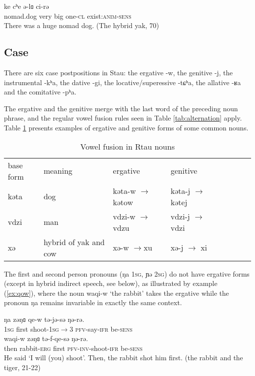 \documentclass[oneside,a4paper,11pt]{article}
\newcommand{\ipa}[1]{{\phon #1}} %
\begin{document}
\begin{exe}
\ex \label{ex:mbrogkhyi}
\gll \ipa{mbroˠcʰə} \ipa{ke} \ipa{cʰe} \ipa{ə-lɞ} \ipa{ci-rə} \\
nomad.dog very big one-\textsc{cl} exist:\textsc{anim}-\textsc{sens}\\
\glt There was a huge nomad dog. (The hybrid yak, 70)
\end{exe}



\subsection{Case} 
There are six case postpositions in Stau: the ergative \ipa{-w}, the genitive \ipa{-j}, the instrumental \ipa{-kʰa}, the dative \ipa{-gi}, the locative/superessive \ipa{-tɕʰa}, the allative \ipa{-ʁa} and the comitative \ipa{-pʰa}.


The ergative and the genitive merge with the last word of the preceding noun phrase, and the regular vowel fusion rules seen in Table \ref{tab:alternation} apply. Table \ref{tab:alternation.noun} presents examples of ergative and genitive forms of some common nouns.

\begin{table}[H]
\caption{Vowel fusion in Rtau nouns} \label{tab:alternation.noun} \centering
\begin{tabular}{l|lllllll}
\toprule
base form & meaning & ergative & genitive \\
\cline{1-4}
\ipa{kəta} & dog & \ipa{kəta-w} $\rightarrow$ \ipa{kətow} & \ipa{kəta-j} $\rightarrow$ \ipa{kətej} & \\
\ipa{vdzi} & man & \ipa{vdzi-w} $\rightarrow$  \ipa{vdzu} & \ipa{vdzi-j} $\rightarrow$ \ipa{vdzi} & \\
\ipa{xə} & hybrid of yak and cow &\ipa{xə-w}  $\rightarrow$\ipa{xu} & \ipa{xə-j} $\rightarrow$ \ipa{xi} & \\
\bottomrule
\end{tabular}
\end{table}

The first and second person pronouns (\ipa{ŋa} \textsc{1sg}, \ipa{ɲə} \textsc{2sg}) do not have ergative forms (except in hybrid indirect speech, see below), as illustrated by example (\ref{ex:qow}), where the noun \ipa{waqi-w}  `the rabbit' takes the ergative while the pronoun \ipa{ŋa} remains invariable in exactly the same context.
 \begin{exe}
\ex \label{ex:qow}
\gll
\ipa{ŋa} 	\ipa{zəŋɞ} 	\ipa{qe-w} \ipa{tə-jə-sə} 	\ipa{ŋə-rə.} \\
\textsc{1sg} first shoot-\textsc{1sg$\rightarrow$3} \textsc{pfv}-say-\textsc{ifr} be-\textsc{sens}\\
\gll \ipa{tɕʰəge,} 	\ipa{waqi-w} 	\ipa{zəŋɞ} 	\ipa{tə-f-qe-sə} 	\ipa{ŋə-rə.} 	\\
then rabbit-\textsc{erg} first \textsc{pfv-inv}-shoot-\textsc{ifr} be-\textsc{sens}\\
\glt He said `I will (you) shoot'. Then, the rabbit shot him first. (the rabbit and the tiger, 21-22)
\end{exe}
\end{document}
